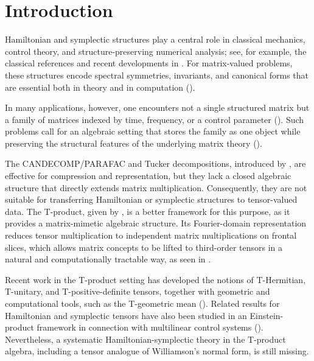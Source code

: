 \documentclass[pdflatex,sn-mathphys-ay]{sn-jnl}
\theoremstyle{thmstyleone}
\theoremstyle{thmstyletwo}
\theoremstyle{thmstylethree}
\numberwithin{equation}{section}
\begin{document}
\section{Introduction}
\label{sec:intro}

Hamiltonian and symplectic structures play a central role in classical mechanics, control theory, and structure-preserving numerical analysis; see, for example, the classical references \cite{mehrmann1991autonomous,hairer2006geometric,arnol2013mathematical} and recent developments in \cite{sun2020structure,pagliantini2021dynamical,mehrmann2023control}. 
For matrix-valued problems, these structures encode spectral symmetries, invariants, and canonical forms that are essential both in theory and in computation (\cite{paige1981schur,mehrmann1991autonomous}). 

In many applications, however, one encounters not a single structured matrix but a family of matrices indexed by time, frequency, or a control parameter (\cite{weedbrook2012gaussian,adesso2014continuous}). 
Such problems call for an algebraic setting that stores the family as one object while preserving the structural features of the underlying matrix theory (\cite{bentbib2025tensor,be2025numerical}).

The CANDECOMP/PARAFAC and Tucker decompositions, introduced by \cite{kolda2009tensor, de2000multilinear}, are effective for compression and representation, but they lack a closed algebraic structure that directly extends matrix multiplication.
Consequently, they are not suitable for transferring Hamiltonian or symplectic structures to tensor-valued data. 
The T-product, given by \cite{kilmer2011factorization, kilmer2013third}, is a better framework for this purpose, as it provides a matrix-mimetic algebraic structure. 
Its Fourier-domain representation reduces tensor multiplication to independent matrix multiplications on frontal slices, which allows matrix concepts to be lifted to third-order tensors in a natural and computationally tractable way, as seen in \cite{kilmer2013third, ju2025geometric}.


Recent work in the T-product setting has developed the notions of T-Hermitian, T-unitary, and T-positive-definite tensors, together with geometric and computational tools, such as the T-geometric mean (\cite{ju2025geometric}). 
Related results for Hamiltonian and symplectic tensors have also been studied in an Einstein-product framework in connection with multilinear control systems (\cite{wang2024algebraic}). 
Nevertheless, a systematic Hamiltonian-symplectic theory in the T-product algebra, including a tensor analogue of Williamson's normal form, is still missing.
\end{document}
